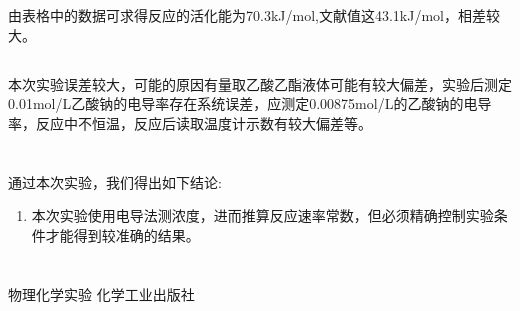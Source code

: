 ﻿\documentclass[10.5pt]{article}
\begin{document}
由表格中的数据可求得反应的活化能为70.3kJ/mol,文献值这43.1kJ/mol，相差较大。


\subsection{\textbf{}}
本次实验误差较大，可能的原因有量取乙酸乙酯液体可能有较大偏差，实验后测定0.01mol/L乙酸钠的电导率存在系统误差，应测定0.00875mol/L的乙酸钠的电导率，反应中不恒温，反应后读取温度计示数有较大偏差等。

\section{\textbf{}}

通过本次实验，我们得出如下结论:
\begin{enumerate}
\item 本次实验使用电导法测浓度，进而推算反应速率常数，但必须精确控制实验条件才能得到较准确的结果。
\end{enumerate}

\section{\textbf{}}
\begin{thebibliography}{}
物理化学实验 \quad 化学工业出版社
\end{thebibliography}
\end{document}
